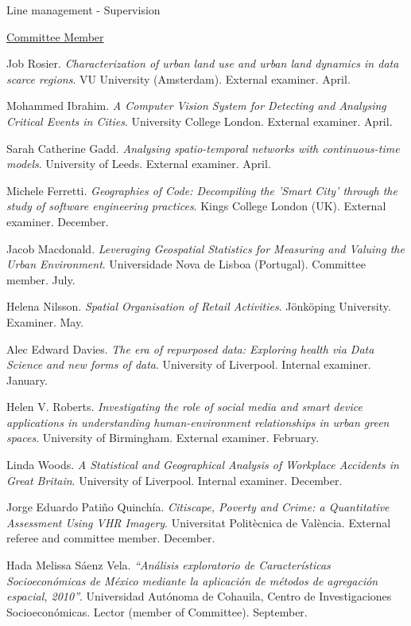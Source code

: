 \documentclass[12pt,2up]{article}
\begin{document}
\begin{cv}{}
\begin{cvlist}{Line management - Supervision}
\item{\underline{Committee Member}}
\item[2025] Job Rosier. \textit{Characterization of urban land use and urban
        land dynamics in data scarce regions}. VU University (Amsterdam).
        External examiner. April.
\item[2021] Mohammed Ibrahim. \textit{A Computer Vision System for Detecting
    and Analysing Critical Events in Cities}. University College London.
    External examiner. April.
\item[    ] Sarah Catherine Gadd. \textit{Analysing spatio-temporal networks
    with continuous-time models}. University of Leeds. External examiner.
    April.
\item[2020] Michele Ferretti. \textit{Geographies of Code: Decompiling the
    'Smart City' through the study of software engineering practices}. Kings
    College London (UK). External examiner. December.
\item[] Jacob Macdonald. \textit{Leveraging Geospatial Statistics for
    Measuring and Valuing the Urban Environment}. Universidade Nova de Lisboa
    (Portugal). Committee member. July.
\item[] Helena Nilsson. \textit{Spatial Organisation of Retail
    Activities}. J{\"o}nk{\"o}ping University. Examiner. May.
\item[2019] Alec Edward Davies. \textit{The era of repurposed data: Exploring health via Data
    Science and new forms of data}. University of Liverpool. Internal
    examiner. January.
\item[2018] Helen V. Roberts. \textit{Investigating the role of social media
        and smart device applications in understanding human-environment
    relationships in urban green spaces}. University of Birmingham. External
    examiner. February.
\item[2016] Linda Woods. \textit{A Statistical and Geographical Analysis
    of Workplace Accidents in Great Britain}. University of Liverpool.
    Internal examiner. December.
\item[2015] Jorge Eduardo Pati\~{n}o Quinch\'{i}a. \textit{Citiscape, Poverty
    and Crime: a Quantitative Assessment Using VHR Imagery}. Universitat
    Polit\`{e}cnica de Val\`{e}ncia. External referee and committee member. December.
\item[\textbf{Master}]
    \item[2012]  Hada Melissa S\'{a}enz Vela. \textit{``An\'{a}lisis exploratorio de
        Caracter\'{i}sticas Socioecon\'{o}micas de M\'{e}xico mediante la
        aplicaci\'{o}n de m\'{e}todos de agregaci\'{o}n espacial, 2010''}.
        Universidad Aut\'{o}noma de Cohauila, Centro de Investigaciones
        Socioecon\'{o}micas. Lector (member of Committee). September.


\end{cvlist}
\end{cv}
\end{document}
